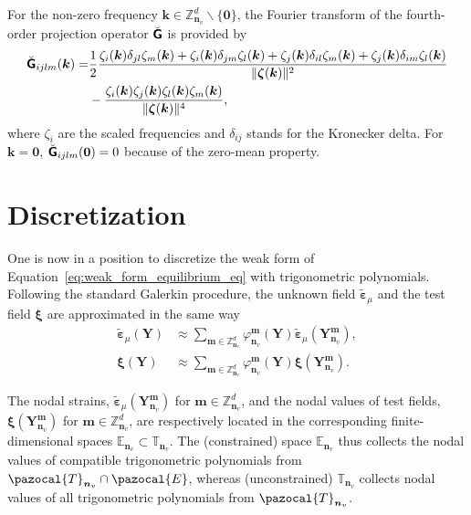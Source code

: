 For the non-zero frequency \(\bm k \in \mathbb{Z}_{\bm n_v}^{d} \backslash\{\bm 0\}\), the Fourier transform of the fourth-order projection operator \(\breve{\boldsymbol{\mathsf{G}}}\) is provided by
\begin{equation} \label{eq:projection_operator_small_strains}
\begin{aligned}
\breve{\boldsymbol{\mathsf{G}}}_{i j l m}(\boldsymbol{k})=& \frac{1}{2} \frac{\zeta_{i}(\boldsymbol{k}) \delta_{j l} \zeta_{m}(\boldsymbol{k})+\zeta_{i}(\boldsymbol{k}) \delta_{j m} \zeta_{l}(\boldsymbol{k})+\zeta_{j}(\boldsymbol{k}) \delta_{i l} \zeta_{m}(\boldsymbol{k})+\zeta_{j}(\boldsymbol{k}) \delta_{i m} \zeta_{l}(\boldsymbol{k})}{\|\boldsymbol{\zeta}(\boldsymbol{k})\|^{2}} \\
&-\frac{\zeta_{i}(\boldsymbol{k}) \zeta_{j}(\boldsymbol{k}) \zeta_{l}(\boldsymbol{k}) \zeta_{m}(\boldsymbol{k})}{\|\boldsymbol{\zeta}(\boldsymbol{k})\|^{4}},
\end{aligned}
\end{equation}
where \(\zeta_{i}\) are the scaled frequencies and \(\delta_{i j}\) stands for the Kronecker delta.
For \(\boldsymbol{k}=\mathbf{0}\), \(\breve{\boldsymbol{\mathsf{G}}}_{i j l m}(\mathbf{0})=0\) because of the zero-mean property.

\section{Discretization}

One is now in a position to discretize the weak form of Equation~\eqref{eq:weak_form_equilibrium_eq} with trigonometric polynomials.
Following the standard Galerkin procedure, the unknown field \(\tilde{\bm \varepsilon}_\mu\) and the test field \(\bm \xi\) are approximated in the same way
\begin{align}
\tilde{\bm\varepsilon}_\mu(\bm{Y}) &\approx \sum_{\bm  m \in \mathbb{Z}_{\bm n_v}^{d}} \varphi_{\bm n_v}^{\bm  m}(\bm{Y}) \tilde{\bm \varepsilon}_\mu \left(\bm Y_{\bm n_v}^{\bm  m}\right), \\
\bm \xi(\bm{Y}) &\approx \sum_{\bm  m \in \mathbb{Z}_{\bm n_v}^{d}} \varphi_{\bm n_v}^{\bm m}(\bm{Y}) \bm \xi\left(\bm{Y}_{\bm n_v}^{\bm  m}\right).
\end{align}

The nodal strains, \(\tilde{\bm\varepsilon}_\mu\left(\bm Y_{\bm n_v}^{\bm  m}\right)\) for \(\bm m\in \mathbb Z^d_{\bm n_v}\), and the nodal values of test fields, \(\bm \xi\left(\bm Y_{\bm n_v}^{\bm  m}\right)\) for \(\bm m\in \mathbb Z^d_{\bm n_v}\), are respectively located in the corresponding finite-dimensional spaces \(\mathbb{E}_{\bm n_v} \subset \mathbb{T}_{\bm n_v}\).
The (constrained) space \(\mathbb{E}_{\bm n_v}\) thus collects the nodal values of compatible trigonometric polynomials from \(\pazocal{T}_{\bm n_v} \cap \pazocal{E}\), whereas (unconstrained) \(\mathbb{T}_{\bm n_v}\) collects nodal values of all trigonometric polynomials from \(\pazocal{T}_{\bm n_v}\).

